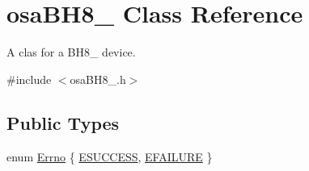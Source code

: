 \hypertarget{classosa_b_h8__280}{\section{osa\-B\-H8\-\_ Class Reference}
\label{classosa_b_h8__280}
}


A clas for a B\-H8\-\_ device.  




{\ttfamily \#include $<$osa\-B\-H8\-\_.\-h$>$}

\subsection*{Public Types}
\begin{DoxyCompactItemize}
\item 
enum \hyperlink{classosa_b_h8__280_ab8ba653b44589ea6165d12717ff97541}{Errno} \{ \hyperlink{classosa_b_h8__280_ab8ba653b44589ea6165d12717ff97541a289fed3893b602379925476347abcd4d}{E\-S\-U\-C\-C\-E\-S\-S}, 
\hyperlink{classosa_b_h8__280_ab8ba653b44589ea6165d12717ff97541a57eddce6577f269dfaa16b115952b6b6}{E\-F\-A\-I\-L\-U\-R\-E}
 \}
\end{DoxyCompactItemize}
